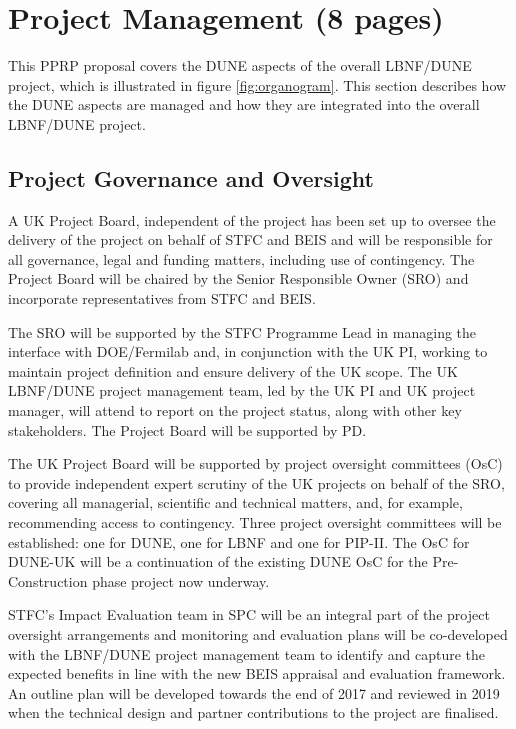 \section{Project Management (8 pages)}

This PPRP proposal covers the DUNE aspects of the overall LBNF/DUNE project, which is illustrated in figure \ref{fig:organogram}. This section describes how the DUNE aspects are managed and how they are integrated into the overall LBNF/DUNE project.

\subsection{Project Governance and Oversight} 

A UK Project Board, independent of the project has been set up to oversee the delivery of the project on behalf of STFC and BEIS and will be responsible for all governance, legal and funding matters, including use of contingency. The Project Board will be chaired by the Senior Responsible Owner (SRO) and incorporate representatives from STFC and BEIS.

The SRO will be supported by the STFC Programme Lead in managing the interface with DOE/Fermilab and, in conjunction with the UK PI, working to maintain project definition and ensure delivery of the UK scope. The UK LBNF/DUNE project management team, led by the UK PI and UK project manager, will attend to report on the project status, along with other key stakeholders. The Project Board will be supported by PD.

The UK Project Board will be supported by project oversight committees (OsC) to provide independent expert scrutiny of the UK projects on behalf of the SRO, covering all managerial, scientific and technical matters, and, for example, recommending access to contingency. Three project oversight committees will be established: one for DUNE, one for LBNF and one for PIP-II. The OsC for DUNE-UK will be a continuation of the existing DUNE OsC for the Pre-Construction phase project now underway.

STFC’s Impact Evaluation team in SPC will be an integral part of the project oversight arrangements and monitoring and evaluation plans will be co-developed with the LBNF/DUNE project management team to identify and capture the expected benefits in line with the new BEIS appraisal and evaluation framework. An outline plan will be developed towards the end of 2017 and reviewed in 2019 when the technical design and partner contributions to the project are finalised.


